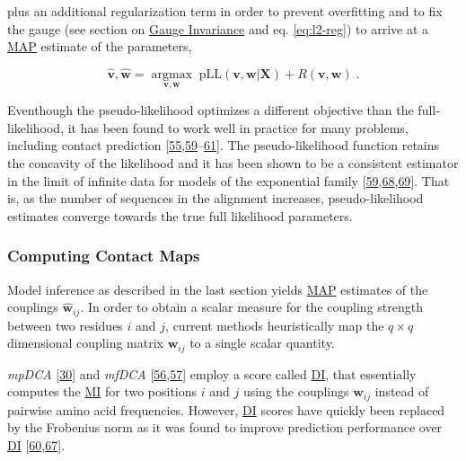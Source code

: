 \documentclass[12pt,a4paper,twoside]{book}
\renewcommand{\v}{\mathbf{v}}
\newcommand{\w}{\mathbf{w}}
\newcommand{\wij}{\mathbf{w}_{ij}}
\theoremstyle{definition}
\theoremstyle{definition}
\theoremstyle{remark}
\begin{document}
plus an additional regularization term in order to prevent overfitting
and to fix the gauge (see section on
\protect\hyperlink{gauge-invariance}{Gauge Invariance} and eq.
\eqref{eq:l2-reg}) to arrive at a \protect\hyperlink{abbrev}{MAP} estimate
of the parameters,

\begin{equation}
    \hat{\v}, \hat{\w} = \underset{\v, \w}{\operatorname{argmax}} \; \text{pLL}(\v, \w | \mathbf{X}) + R(\v, \w) \; .
\end{equation}

Eventhough the pseudo-likelihood optimizes a different objective than
the full-likelihood, it has been found to work well in practice for many
problems, including contact prediction
{[}\protect\hyperlink{ref-Murphy2012}{55},\protect\hyperlink{ref-Koller2009}{59}--\protect\hyperlink{ref-Stein2015a}{61}{]}.
The pseudo-likelihood function retains the concavity of the likelihood
and it has been shown to be a consistent estimator in the limit of
infinite data for models of the exponential family
{[}\protect\hyperlink{ref-Koller2009}{59},\protect\hyperlink{ref-Besag1975}{68},\protect\hyperlink{ref-Gidas1988}{69}{]}.
That is, as the number of sequences in the alignment increases,
pseudo-likelihood estimates converge towards the true full likelihood
parameters.

\subsubsection{Computing Contact Maps}\label{post-processing-heuristics}

Model inference as described in the last section yields
\protect\hyperlink{abbrev}{MAP} estimates of the couplings
\(\hat{\w}_{ij}\). In order to obtain a scalar measure for the coupling
strength between two residues \(i\) and \(j\), current methods
heuristically map the \(q \! \times \! q\) dimensional coupling matrix
\(\wij\) to a single scalar quantity.

\emph{mpDCA} {[}\protect\hyperlink{ref-Weigt2009}{30}{]} and
\emph{mfDCA}
{[}\protect\hyperlink{ref-Morcos2011}{56},\protect\hyperlink{ref-Marks2011}{57}{]}
employ a score called \protect\hyperlink{abbrev}{DI}, that essentially
computes the \protect\hyperlink{abbrev}{MI} for two positions \(i\) and
\(j\) using the couplings \(\wij\) instead of pairwise amino acid
frequencies. However, \protect\hyperlink{abbrev}{DI} scores have quickly
been replaced by the Frobenius norm as it was found to improve
prediction performance over \protect\hyperlink{abbrev}{DI}
{[}\protect\hyperlink{ref-Ekeberg2013}{60},\protect\hyperlink{ref-Baldassi2014}{67}{]}.
\end{document}
